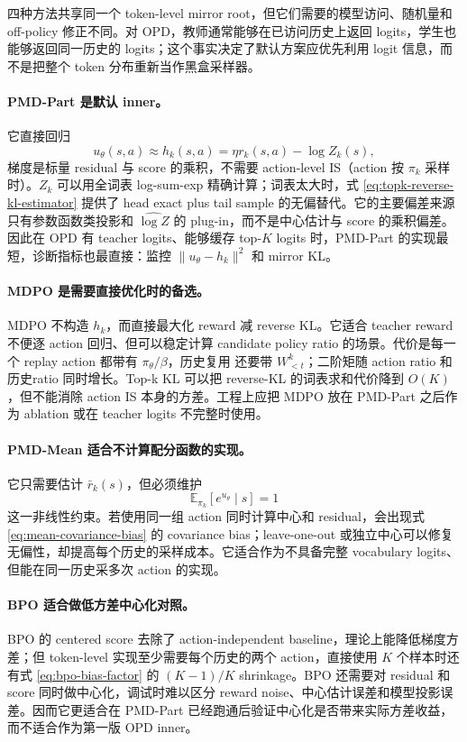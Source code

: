 四种方法共享同一个 token-level mirror root，但它们需要的模型访问、随机量和 off-policy 修正不同。对 OPD，教师通常能够在已访问历史上返回 logits，学生也能够返回同一历史的 logits；这个事实决定了默认方案应优先利用 logit 信息，而不是把整个 token 分布重新当作黑盒采样器。

\paragraph*{PMD-Part 是默认 inner。}
它直接回归
\[
 u_\theta(s,a)\approx h_k(s,a)=\eta r_k(s,a)-\log Z_k(s),
\]
梯度是标量 residual 与 score 的乘积，不需要 action-level IS（action 按 $\pi_k$ 采样时）。$Z_k$ 可以用全词表 log-sum-exp 精确计算；词表太大时，式 \eqref{eq:topk-reverse-kl-estimator} 提供了 head exact plus tail sample 的无偏替代。它的主要偏差来源只有参数函数类投影和 $\widehat{\log Z}$ 的 plug-in，而不是中心估计与 score 的乘积偏差。因此在 OPD 有 teacher logits、能够缓存 top-$K$ logits 时，PMD-Part 的实现最短，诊断指标也最直接：监控 $\|u_\theta-h_k\|^2$ 和 mirror KL。

\paragraph*{MDPO 是需要直接优化时的备选。}
MDPO 不构造 $h_k$，而直接最大化 reward 减 reverse KL。它适合 teacher reward 不便逐 action 回归、但可以稳定计算 candidate policy ratio 的场景。代价是每一个 replay action 都带有 $\pi_\theta/\beta$，历史复用 还要带 $W^k_{<t}$；二阶矩随 action ratio 和历史ratio 同时增长。Top-k KL 可以把 reverse-KL 的词表求和代价降到 $O(K)$，但不能消除 action IS 本身的方差。工程上应把 MDPO 放在 PMD-Part 之后作为 ablation 或在 teacher logits 不完整时使用。

\paragraph*{PMD-Mean 适合不计算配分函数的实现。}
它只需要估计 $\bar r_k(s)$，但必须维护
\[
 \mathbb E_{\pi_k}[e^{u_\theta}\mid s]=1
\]
这一非线性约束。若使用同一组 action 同时计算中心和 residual，会出现式 \eqref{eq:mean-covariance-bias} 的 covariance bias；leave-one-out 或独立中心可以修复无偏性，却提高每个历史的采样成本。它适合作为不具备完整 vocabulary logits、但能在同一历史采多次 action 的实现。

\paragraph*{BPO 适合做低方差中心化对照。}
BPO 的 centered score 去除了 action-independent baseline，理论上能降低梯度方差；但 token-level 实现至少需要每个历史的两个 action，直接使用 $K$ 个样本时还有式 \eqref{eq:bpo-bias-factor} 的 $ (K-1)/K$ shrinkage。BPO 还需要对 residual 和 score 同时做中心化，调试时难以区分 reward noise、中心估计误差和模型投影误差。因而它更适合在 PMD-Part 已经跑通后验证中心化是否带来实际方差收益，而不适合作为第一版 OPD inner。

